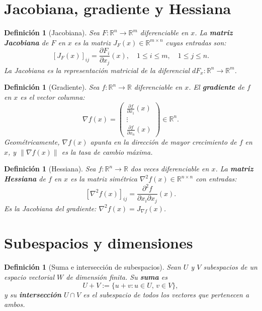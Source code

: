 \documentclass[a4paper,11pt]{report}
\newtheorem{definition}[theorem]{Definición}
\begin{document}
\section{Jacobiana, gradiente y Hessiana}

\begin{definition}[Jacobiana]
Sea $F: \mathbb{R}^n \to \mathbb{R}^m$ diferenciable en $x$. La \textbf{matriz Jacobiana} de $F$ en $x$ es la matriz $J_F(x) \in \mathbb{R}^{m \times n}$ cuyas entradas son:
\[
[J_F(x)]_{ij} = \frac{\partial F_i}{\partial x_j}(x), \quad 1 \leq i \leq m, \quad 1 \leq j \leq n.
\]
La Jacobiana es la representación matricial de la diferencial $dF_x: \mathbb{R}^n \to \mathbb{R}^m$.
\end{definition}

\begin{definition}[Gradiente]
Sea $f: \mathbb{R}^n \to \mathbb{R}$ diferenciable en $x$. El \textbf{gradiente} de $f$ en $x$ es el vector columna:
\[
\nabla f(x) = \begin{pmatrix} \frac{\partial f}{\partial x_1}(x) \\ \vdots \\ \frac{\partial f}{\partial x_n}(x) \end{pmatrix} \in \mathbb{R}^n.
\]
Geométricamente, $\nabla f(x)$ apunta en la dirección de mayor crecimiento de $f$ en $x$, y $\|\nabla f(x)\|$ es la tasa de cambio máxima.
\end{definition}

\begin{definition}[Hessiana]
Sea $f: \mathbb{R}^n \to \mathbb{R}$ dos veces diferenciable en $x$. La \textbf{matriz Hessiana} de $f$ en $x$ es la matriz simétrica $\nabla^2 f(x) \in \mathbb{R}^{n \times n}$ con entradas:
\[
[\nabla^2 f(x)]_{ij} = \frac{\partial^2 f}{\partial x_i \partial x_j}(x).
\]
Es la Jacobiana del gradiente: $\nabla^2 f(x) = J_{\nabla f}(x)$.
\end{definition}

\section{Subespacios y dimensiones}

\begin{definition}[Suma e intersección de subespacios]
Sean $U$ y $V$ subespacios de un espacio vectorial $W$ de dimensión finita. Su \textbf{suma} es
\[
U + V := \{u + v : u \in U,\, v \in V\},
\]
y su \textbf{intersección} $U \cap V$ es el subespacio de todos los vectores que pertenecen a ambos.
\end{definition}
\end{document}
